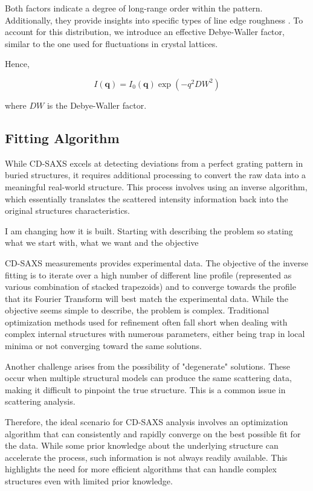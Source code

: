 Both factors indicate a degree of long-range order within the pattern. Additionally, they provide insights into specific types of line edge roughness \cite{these_reche}.
To account for this distribution, we introduce an effective Debye-Waller factor, similar to the one used for fluctuations in crystal lattices.

Hence,

\begin{equation}
    I(\mathbf{q}) = I_{0}(\mathbf{q}) \exp(-q^{2}DW^{2} )
\end{equation}

where $DW$ is the Debye-Waller factor.

\subsection{Fitting Algorithm}

While CD-SAXS excels at detecting deviations from a perfect grating pattern in buried structures, it requires 
additional processing to convert the raw data into a meaningful real-world structure. This process involves using 
an inverse algorithm, which essentially translates the scattered intensity information back into the original structures 
characteristics.

\medskip
\color{red} I am changing how it is built. Starting with describing the problem so stating what we start with, what we want and the objective \color{black}

CD-SAXS measurements provides experimental data. The objective of the inverse fitting is to iterate over a high number of different line profile (represented as various combination of stacked trapezoids)
and to converge towards the profile that its Fourier Transform will best match the experimental data. While the objective seems simple to describe, 
the problem is complex. Traditional optimization methods used for refinement often fall short when dealing with 
complex internal structures with numerous parameters, either being trap in local minima or not converging toward the same solutions.

\medskip

Another challenge arises from the possibility of "degenerate" solutions. These occur when multiple structural 
models can produce the same scattering data, making it difficult to pinpoint the true structure. This is a common 
issue in scattering analysis.

\medskip

Therefore, the ideal scenario for CD-SAXS analysis involves an optimization algorithm that can consistently and 
rapidly converge on the best possible fit for the data. While some prior knowledge about the underlying structure 
can accelerate the process, such information is not always readily available. This highlights the need for more 
efficient algorithms that can handle complex structures even with limited prior knowledge.

